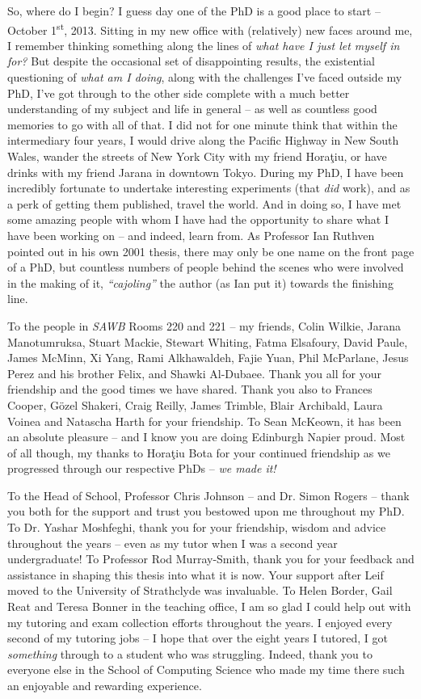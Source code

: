 \begin{preamble}
So, where do I begin? I guess day one of the PhD is a good place to start -- October 1\textsuperscript{st}, 2013. Sitting in my new office with (relatively) new faces around me, I remember thinking something along the lines of \emph{what have I just let myself in for?} But despite the occasional set of disappointing results, the existential questioning of \emph{what am I doing}, along with the challenges I've faced outside my PhD, I've got through to the other side complete with a much better understanding of my subject and life in general -- as well as countless good memories to go with all of that. I did not for one minute think that within the intermediary four years, I would drive along the Pacific Highway in New South Wales, wander the streets of New York City with my friend Hora\c{t}iu, or have drinks with my friend Jarana in downtown Tokyo. During my PhD, I have been incredibly fortunate to undertake interesting experiments (that \emph{did} work), and as a perk of getting them published, travel the world. And in doing so, I have met some amazing people with whom I have had the opportunity to share what I have been working on -- and indeed, learn from. As Professor Ian Ruthven pointed out in his own 2001 thesis, there may only be one name on the front page of a PhD, but countless numbers of people behind the scenes who were involved in the making of it, \emph{``cajoling''} the author (as Ian put it) towards the finishing line.

To the people in \emph{SAWB} Rooms 220 and 221 -- my friends, Colin Wilkie, Jarana Manotumruksa, Stuart Mackie, Stewart Whiting, Fatma Elsafoury, David Paule, James McMinn, Xi Yang, Rami Alkhawaldeh, Fajie Yuan, Phil McParlane, Jesus Perez and his brother Felix, and Shawki Al-Dubaee. Thank you all for your friendship and the good times we have shared. Thank you also to Frances Cooper, G\"{o}zel Shakeri, Craig Reilly, James Trimble, Blair Archibald, Laura Voinea and Natascha Harth for your friendship. To Sean McKeown, it has been an absolute pleasure -- and I know you are doing Edinburgh Napier proud. Most of all though, my thanks to Hora\c{t}iu Bota for your continued friendship as we progressed through our respective PhDs -- \emph{we made it!}

To the Head of School, Professor Chris Johnson -- and Dr. Simon Rogers -- thank you both for the support and trust you bestowed upon me throughout my PhD. To Dr. Yashar Moshfeghi, thank you for your friendship, wisdom and advice throughout the years -- even as my tutor when I was a second year undergraduate! To Professor Rod Murray-Smith, thank you for your feedback and assistance in shaping this thesis into what it is now. Your support after Leif moved to the University of Strathclyde was invaluable. To Helen Border, Gail Reat and Teresa Bonner in the teaching office, I am so glad I could help out with my tutoring and exam collection efforts throughout the years. I enjoyed every second of my tutoring jobs -- I hope that over the eight years I tutored, I got \emph{something} through to a student who was struggling. Indeed, thank you to everyone else in the School of Computing Science who made my time there such an enjoyable and rewarding experience.


\end{preamble}
